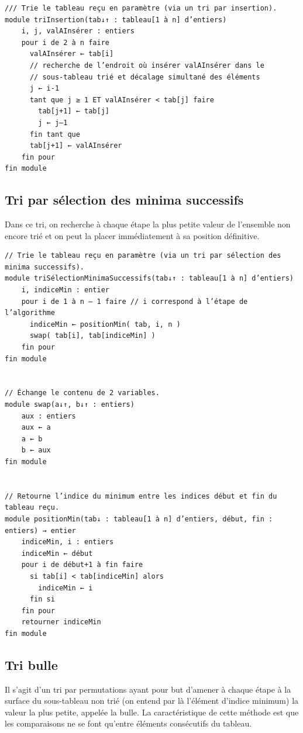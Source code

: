 \documentclass[11pt,a4paper]{article}
\begin{document}
            \par
        \begin{verbatim}
/// Trie le tableau reçu en paramètre (via un tri par insertion).
module triInsertion(tab↓↑ : tableau[1 à n] d’entiers)
    i, j, valAInsérer : entiers
    pour i de 2 à n faire
      valAInsérer ← tab[i]
      // recherche de l’endroit où insérer valAInsérer dans le
      // sous-tableau trié et décalage simultané des éléments
      j ← i-1
      tant que j ≥ 1 ET valAInsérer < tab[j] faire
        tab[j+1] ← tab[j]
        j ← j–1
      fin tant que
      tab[j+1] ← valAInsérer
    fin pour
fin module
\end{verbatim}\subsection{Tri par s\'election des minima successifs}
		    Dans ce tri, on recherche \`a chaque \'etape la plus petite valeur de l'ensemble non encore tri\'e
        et on peut la placer imm\'ediatement \`a sa position d\'efinitive.
      
            \par
        \begin{verbatim}
// Trie le tableau reçu en paramètre (via un tri par sélection des minima successifs).
module triSélectionMinimaSuccessifs(tab↓↑ : tableau[1 à n] d’entiers)
    i, indiceMin : entier
    pour i de 1 à n – 1 faire // i correspond à l’étape de l’algorithme
      indiceMin ← positionMin( tab, i, n )
      swap( tab[i], tab[indiceMin] )
    fin pour
fin module


// Échange le contenu de 2 variables.
module swap(a↓↑, b↓↑ : entiers)
    aux : entiers
    aux ← a
    a ← b
    b ← aux
fin module


// Retourne l’indice du minimum entre les indices début et fin du tableau reçu.
module positionMin(tab↓ : tableau[1 à n] d’entiers, début, fin : entiers) → entier
    indiceMin, i : entiers
    indiceMin ← début
    pour i de début+1 à fin faire
      si tab[i] < tab[indiceMin] alors
        indiceMin ← i
      fin si
    fin pour
    retourner indiceMin
fin module

      \end{verbatim}\subsection{Tri bulle}
		    Il s'agit d'un tri par permutations ayant pour but d'amener \`a chaque \'etape \`a la \guillemotleft  surface \guillemotright 
        du sous-tableau non tri\'e (on entend par l\`a l'\'el\'ement d'indice minimum) la valeur la plus
        petite, appel\'ee la bulle. La caract\'eristique de cette m\'ethode est que les comparaisons ne se
        font qu'entre \'el\'ements cons\'ecutifs du tableau.
		  
\end{document}
